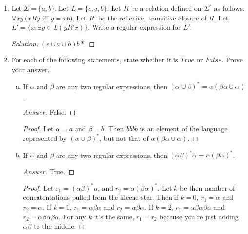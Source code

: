 \documentclass[10pt]{article}
\begin{document}
\begin{enumerate}[1)]
\item
Let $\Sigma = \{a, b\}$.  Let $L = \{\epsilon, a, b\}$. Let $R$ be a relation defined on $\Sigma ^*$ as follows: $\forall xy\ (xRy$ iff $y = xb)$.  Let $R'$ be the reflexive, transitive closure of $R$.  Let $L' = \{x : \exists y \in L (yR'x)\}$.  Write a regular expression for $L'$.
\begin{proof}[Solution]
$(\epsilon \cup a \cup b)b*$
\end{proof}
\addtocounter{enumi}{1}
\item
For each of the following statements, state whether it is $True$ or $False$.  Prove your answer.
\begin{enumerate}[a)]
\addtocounter{enumii}{6}
\item
If $\alpha$ and $\beta$ are any two regular expressions, then $(\alpha \cup \beta)^* = \alpha(\beta\alpha \cup \alpha)$.
\begin{proof}[Answer]
False.
\end{proof}
\begin{proof}
Let $\alpha = a$ and $\beta = b$.  Then $bbbb$ is an element of the language represented by $(\alpha \cup \beta)^*$, but not that of $\alpha(\beta\alpha \cup \alpha)$.
\end{proof}
\item
If $\alpha$ and $\beta$ are any two regular expressions, then $(\alpha\beta)^*\alpha = \alpha(\beta\alpha)^*$.
\begin{proof}[Answer]
True.
\end{proof}
\begin{proof}
Let $r_1 = (\alpha\beta)^*\alpha$, and $r_2 = \alpha(\beta\alpha)^*$.  Let $k$ be then number of concatentations pulled from the kleene star.  Then if $k = 0$, $r_1 = \alpha$ and $r_2 = \alpha$.  If $k = 1$, $r_1 = \alpha \beta \alpha$ and $r_2 = \alpha \beta \alpha$.  If $k = 2$, $r_1 = \alpha \beta \alpha \beta \alpha$ and $r_2 = \alpha \beta \alpha \beta \alpha$. For any $k$ it's the same, $r_1 = r_2$ because you're just adding $\alpha \beta$ to the middle. 
\end{proof}
\end{enumerate}
\end{enumerate}
\end{document}
